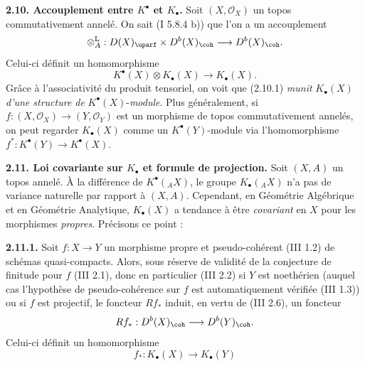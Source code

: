 \textbf{2.10. Accouplement entre \(K^{\bullet}\) et \(K_{\bullet}\).} Soit \((X,\mathcal O_X)\) un topos commutativement annelé. On sait (I 5.8.4 b)) que l'on a un accouplement
\[
 \otimes_A^{\mathrm L}:D(X)_{\uparf}\times D^b(X)_{\coh}
 \longrightarrow D^b(X)_{\coh}.
\]
Celui-ci définit un homomorphisme
\begin{equation}\tag{2.10.1}
 K^{\bullet}(X)\otimes K_{\bullet}(X)\longrightarrow K_{\bullet}(X).
\end{equation}
Grâce à l'associativité du produit tensoriel, on voit que (2.10.1) \emph{munit} \(K_{\bullet}(X)\) \emph{d'une structure de} \(K^{\bullet}(X)\)-\emph{module}. Plus généralement, si \(f:(X,\mathcal O_X)\longrightarrow(Y,\mathcal O_Y)\) est un morphisme de topos commutativement annelés, on peut regarder \(K_{\bullet}(X)\) comme un \(K^{\bullet}(Y)\)-module via l'homomorphisme \(f^*:K^{\bullet}(Y)\longrightarrow K^{\bullet}(X)\).

\textbf{2.11. Loi covariante sur \(K_{\bullet}\) et formule de projection.} Soit \((X,A)\) un topos annelé. À la différence de \(K^{\bullet}({}_A X)\), le groupe \(K_\bullet({}_A X)\) n'a pas de variance naturelle par rapport à \((X,A)\). Cependant, en Géométrie Algébrique et en Géométrie Analytique, \(K_{\bullet}(X)\) a tendance à être \emph{covariant} en \(X\) pour les morphismes \emph{propres}. Précisons ce point :

\textbf{2.11.1.} Soit \(f:X\to Y\) un morphisme propre et pseudo-cohérent (III 1.2) de schémas quasi-compacts. Alors, sous réserve de validité de la conjecture de finitude pour \(f\) (III 2.1), donc en particulier (III 2.2) si \(Y\) est noethérien (auquel cas l'hypothèse de pseudo-cohérence sur \(f\) est automatiquement vérifiée (III 1.3)) ou si \(f\) est projectif, le foncteur \(Rf_*\) induit, en vertu de (III 2.6), un foncteur
\[
 Rf_*:D^b(X)_{\coh}\longrightarrow D^b(Y)_{\coh}.
\]
Celui-ci définit un
homomorphisme
\begin{equation}\tag{2.11.1.1}
 f_*:K_{\bullet}(X)\longrightarrow K_{\bullet}(Y)
\end{equation}
